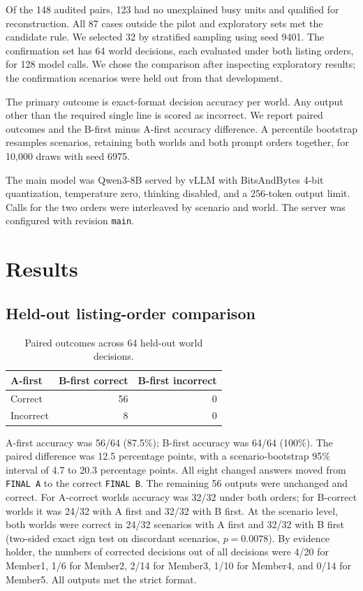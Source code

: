 \documentclass[letterpaper]{article}
\begin{document}
Of the 148 audited pairs, 123 had no unexplained busy units and qualified for reconstruction. All 87 cases outside the pilot and exploratory sets met the candidate rule. We selected 32 by stratified sampling using seed 9401. The confirmation set has 64 world decisions, each evaluated under both listing orders, for 128 model calls. We chose the comparison after inspecting exploratory results; the confirmation scenarios were held out from that development.

The primary outcome is exact-format decision accuracy per world. Any output other than the required single line is scored as incorrect. We report paired outcomes and the B-first minus A-first accuracy difference. A percentile bootstrap resamples scenarios, retaining both worlds and both prompt orders together, for 10,000 draws with seed 6975.

The main model was Qwen3-8B served by vLLM with BitsAndBytes 4-bit quantization, temperature zero, thinking disabled, and a 256-token output limit. Calls for the two orders were interleaved by scenario and world. The server was configured with revision \texttt{main}.

\section{Results}

\subsection{Held-out listing-order comparison}

\begin{table}[t]
\centering
\begin{tabular}{lrr}
\toprule
A-first & B-first correct & B-first incorrect \\
\midrule
Correct & 56 & 0 \\
Incorrect & 8 & 0 \\
\bottomrule
\end{tabular}
\caption{Paired outcomes across 64 held-out world decisions.}
\end{table}

A-first accuracy was 56/64 (87.5\%); B-first accuracy was 64/64 (100\%). The paired difference was 12.5 percentage points, with a scenario-bootstrap 95\% interval of 4.7 to 20.3 percentage points. All eight changed answers moved from \texttt{FINAL A} to the correct \texttt{FINAL B}. The remaining 56 outputs were unchanged and correct. For A-correct worlds accuracy was 32/32 under both orders; for B-correct worlds it was 24/32 with A first and 32/32 with B first. At the scenario level, both worlds were correct in 24/32 scenarios with A first and 32/32 with B first (two-sided exact sign test on discordant scenarios, $p=0.0078$). By evidence holder, the numbers of corrected decisions out of all decisions were 4/20 for Member1, 1/6 for Member2, 2/14 for Member3, 1/10 for Member4, and 0/14 for Member5. All outputs met the strict format.
\end{document}
